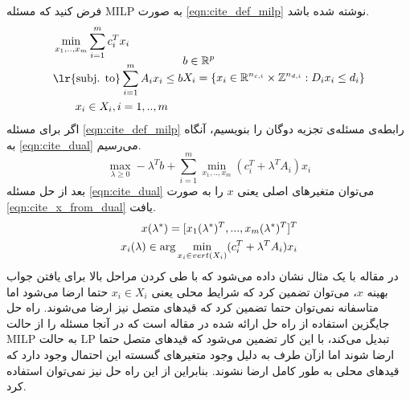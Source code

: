 	فرض کنید که مسئله MILP به صورت \cref{eqn:cite_def_milp} نوشته شده باشد. 
	\begin{subequations}
		\begin{align}\label{eqn:cite_def_milp}
			&\min_{x_1,..,x_m} \sum_{i=1}^m c_i^Tx_i \notag \\
			&\text{\lr{subj. to}} \sum_{i=1}^m A_ix_i \le b \notag \\
			&\quad\quad x_i \in X_i, i = 1,..,m
		\end{align}
		\begin{align}
			&b \in \mathbb{R}^p \notag \\
			&X_i = \{x_i\in \mathbb{R}^{n_{c,i}}\times \mathbb{Z}^{n_{d,i}}:D_ix_i \le d_i\}
		\end{align}
	\end{subequations}
	اگر برای مسئله \cref{eqn:cite_def_milp} رابطه‌ی مسئله‌ی تجزیه دوگان را بنویسیم، آنگاه به \cref{eqn:cite_dual}  می‌رسیم. 
	\begin{equation}\label{eqn:cite_dual}
		\max_{\lambda \ge 0} - \lambda^Tb + \sum_{i=1}^m \min_{x_1,..,x_m}(c_i^T + \lambda^TA_i)x_i
	\end{equation}
	بعد از حل مسئله \cref{eqn:cite_dual} می‌توان متغیرهای اصلی یعنی $x$ را به صورت \cref{eqn:cite_x_from_dual} یافت. 
	\begin{align}\label{eqn:cite_x_from_dual}
		x(\lambda^*) = [x_1(\lambda^*)^T, ..., x_m(\lambda^*)^T]^T \notag \\
		x_i(\lambda) \in \arg \min_{x_i \in vert(X_i)} (c_i^T + \lambda^TA_i)x_i
	\end{align}
	در مقاله \cite{decentralized_approach} با یک مثال نشان داده می‌شود که با طی کردن مراحل بالا برای یافتن جواب بهینه $x$، می‌توان تضمین کرد که شرایط محلی یعنی $x_i \in X_i$ حتما ارضا می‌شود اما متاسفانه نمی‌توان حتما تضمین کرد که قیدهای متصل نیز ارضا می‌شوند. راه حل جایگزین استفاده از راه حل ارائه شده در مقاله \cite{shor2012minimization} است که در آنجا مسئله را از حالت MILP به حالت LP تبدیل می‌کند، با این کار تضمین می‌شود که قیدهای متصل حتما ارضا شوند اما ازآن طرف به دلیل وجود متغیرهای گسسته این احتمال وجود دارد که قیدهای محلی به طور کامل ارضا نشوند. بنابراین از این راه حل نیز نمی‌توان استفاده کرد. 
